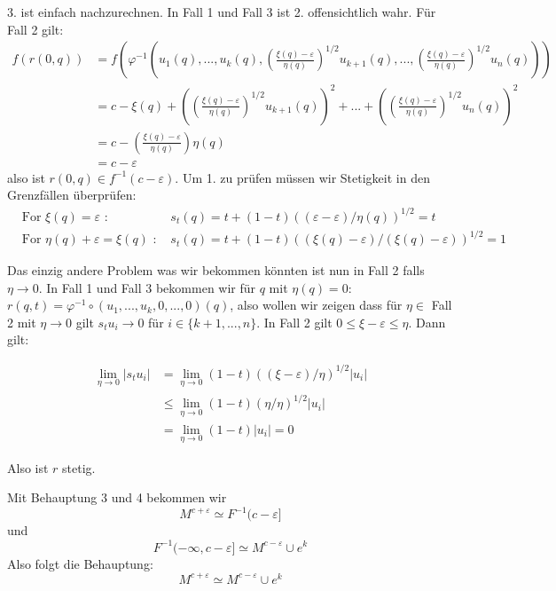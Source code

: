 \begin{bigproof}
\begin{smallproof}
        3. ist einfach nachzurechnen. In Fall 1 und Fall 3 ist 2. offensichtlich
        wahr. Für Fall 2 gilt:
        \begin{align*} 
            f(r(0, q)) & = 
                f\left( \varphi^{-1} \left(u_1(q), ..., u_k(q), 
                \left( \frac{\xi(q) - \varepsilon}{\eta(q)} \right)^{1/2}u_{k + 1}(q), ...,
                \left( \frac{\xi(q) - \varepsilon}{\eta(q)} \right)^{1/2}u_n(q)
                \right)
                \right) \\
            & = c - \xi(q)
                + \left( \left( \frac{\xi(q) - \varepsilon}{\eta(q)} \right)^{1/2}u_{k + 1}(q) \right)^2 + ... 
                + \left( \left( \frac{\xi(q) - \varepsilon}{\eta(q)} \right)^{1/2}u_n(q) \right)^2 \\
            & = c - \left( \frac{\xi(q) - \varepsilon}{\eta(q)} \right) \eta(q) \\
            & = c - \varepsilon
        \end{align*}
        also ist $r(0, q) \in f^{-1}(c - \varepsilon)$. Um 1. zu prüfen müssen wir 
        Stetigkeit in den Grenzfällen überprüfen:
        \begin{align*}
            & \text{For } \xi(q) = \varepsilon \text{ : }
                & s_t(q)  =t + (1 - t)((\varepsilon - \varepsilon)/\eta(q))^{1/2} = t \\
            & \text{For } \eta(q) + \varepsilon = \xi(q) \text{ : }
                & s_t(q) = t + (1 - t)((\xi(q) - \varepsilon)/(\xi(q) - \varepsilon))^{1/2} = 1
        \end{align*}

        Das einzig andere Problem was wir bekommen könnten ist nun in Fall 2 falls
        $\eta \to 0$. In Fall 1 und Fall 3 bekommen wir für $q$ mit $\eta(q) = 0$:
        $r(q, t) = \varphi^{-1} \circ (u_1, ..., u_k, 0, ..., 0)(q)$, also wollen
        wir zeigen dass für $\eta \in $ Fall 2 mit $\eta \to 0$ gilt $s_tu_i \to 0$
        für $i \in \{k+1, ..., n\}$. In Fall 2 gilt
        $0 \leq \xi - \varepsilon \leq \eta$. Dann gilt:

        \begin{align*}
            \lim\limits_{\eta \to 0} | s_t u_i |
            & = \lim\limits_{\eta \to 0} (1 - t)((\xi - \varepsilon)/\eta)^{1/2} | u_i | \\
            & \leq \lim\limits_{\eta \to 0} (1 - t)(\eta/\eta)^{1/2}|u_i| \\
            & = \lim\limits_{\eta \to 0} (1 - t)|u_i| = 0 
        \end{align*}
        
        Also ist $r$ stetig.
    \end{smallproof}

    Mit Behauptung 3 und 4 bekommen wir
    \[ M^{c + \varepsilon} \simeq F^{-1}(c - \varepsilon] \]
    und 
    \[ F^{-1}(-\infty, c - \varepsilon] \simeq M^{c - \varepsilon} \cup e^k \]
    Also folgt die Behauptung:
    \[ M^{c + \varepsilon} \simeq M^{c - \varepsilon} \cup e^k \]

\end{bigproof}
